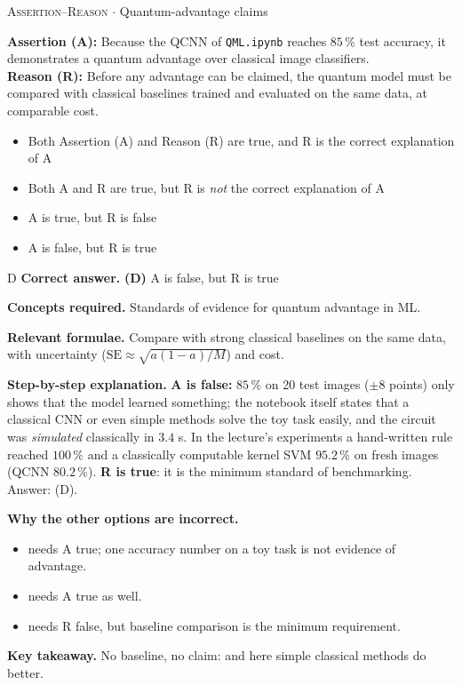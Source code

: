 \documentclass[11pt,a4paper]{article}
\newcommand{\optlabel}[1]{\textbf{(#1)}}
\newcommand{\correctlabel}[1]{\textcolor{okgreen}{\textbf{(#1)}\,\ding{51}}}
\newenvironment{qitem}[1]{\begin{list}{}{\setlength{\leftmargin}{3.3em}\setlength{\labelwidth}{3.1em}%
  \setlength{\labelsep}{0.2em}\setlength{\topsep}{3pt}\setlength{\parsep}{3pt}}\item[\textbf{Q.#1}\hfill]}{\end{list}}
\newcommand{\qsep}{\par\vspace{2pt}{\color{black!15}\hrule}\vspace{4pt}}
\newcommand{\qmeta}[2]{{\footnotesize\color{black!60}\textsc{#1} \;$\cdot$\; #2}\par}
\begin{document}
\begin{qitem}{77}
\qmeta{Assertion--Reason}{Quantum-advantage claims}
\textbf{Assertion (A):} Because the QCNN of \texttt{QML.ipynb} reaches $85\,\%$ test accuracy, it demonstrates a quantum advantage
over classical image classifiers.\\[1mm]
\textbf{Reason (R):} Before any advantage can be claimed, the quantum model must be compared with classical baselines trained and
evaluated on the same data, at comparable cost.
\begin{itemize}[leftmargin=2.6em, labelsep=0.4em, itemsep=2pt, topsep=3pt]
\item[\optlabel{A}] Both Assertion (A) and Reason (R) are true, and R is the correct explanation of A
\item[\optlabel{B}] Both A and R are true, but R is \emph{not} the correct explanation of A
\item[\optlabel{C}] A is true, but R is false
\item[\correctlabel{D}] A is false, but R is true
\end{itemize}
\end{qitem}
\begin{solbox}{D}
\textbf{\color{brand}Correct answer.} \textcolor{okgreen}{\textbf{(D)}} A is false, but R is true

\textbf{\color{brand}Concepts required.} Standards of evidence for quantum advantage in ML.

\textbf{\color{brand}Relevant formulae.} Compare with strong classical baselines on the same data, with uncertainty ($\mathrm{SE} \approx \sqrt{a(1-a)/M}$) and cost.

\textbf{\color{brand}Step-by-step explanation.} \textbf{A is false:} $85\,\%$ on 20 test images ($\pm8$ points) only shows that the model learned something; the notebook itself states
that a classical CNN or even simple methods solve the toy task easily, and the circuit was \emph{simulated} classically in $3.4$ s.
In the lecture's experiments a hand-written rule reached $100\,\%$ and a classically computable kernel SVM $95.2\,\%$ on fresh images
(QCNN $80.2\,\%$). \textbf{R is true}: it is the minimum standard of benchmarking. Answer: (D).

\textbf{\color{brand}Why the other options are incorrect.}
\begin{itemize}[leftmargin=2.4em, itemsep=1pt, topsep=2pt]
\item[\textbf{(A)}] needs A true; one accuracy number on a toy task is not evidence of advantage.
\item[\textbf{(B)}] needs A true as well.
\item[\textbf{(C)}] needs R false, but baseline comparison is the minimum requirement.
\end{itemize}
\textbf{\color{brand}Key takeaway.} No baseline, no claim: and here simple classical methods do better.
\end{solbox}
\qsep
\end{document}
